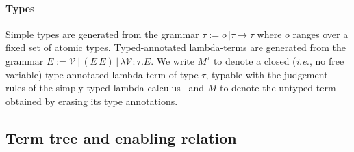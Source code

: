 \documentclass{elsarticle}
\makeatletter
\theoremstyle{plain}
\theoremstyle{definition}
\newcommand\VarSet{\mathcal{V}}
\renewcommand\ie{{\it i.e.\@\xspace}}
\makeatother
\begin{document}
\paragraph{Types} Simple types are generated from the grammar $\tau := o\, | \tau \rightarrow \tau$ where $o$ ranges over a fixed set of atomic types. Typed-annotated lambda-terms are generated from the grammar $E := \VarSet\, |\, (E\, E)\, |\, \lambda \VarSet \colon\tau. E $.
We write $M^\tau$ to denote a closed (\ie, no free variable)
type-annotated lambda-term of type $\tau$, typable with the judgement rules of the simply-typed lambda calculus~\cite{Barendregt84} and $M$ to denote the untyped term obtained by erasing its type annotations.

\subsection{Term tree and enabling relation}
\end{document}
